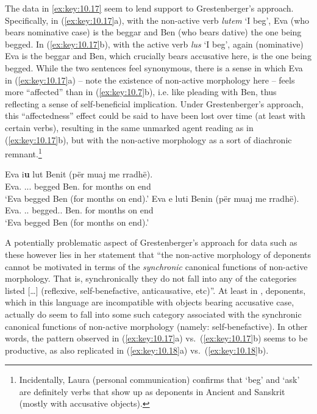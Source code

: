 \documentclass[output=paper]{langsci/langscibook}
\begin{document}
The  data in \eqref{ex:key:10.17} seem to lend support to Grestenberger’s
approach. Specifically, in (\ref{ex:key:10.17}a), with the non-active verb
\emph{lutem} ‘I beg’, Eva (who bears nominative case) is the beggar and Ben
(who bears dative) the one being begged. In (\ref{ex:key:10.17}b), with the active
verb \emph{lus} ‘I beg’, again (nominative) Eva is the beggar and Ben, which
crucially bears accusative here, is the one being begged. While the two
sentences feel synonymous, there is a sense in which Eva in (\ref{ex:key:10.17}a) –
note the existence of non-active morphology here – feels more
\enquote{affected} than in (\ref{ex:key:10.7}b), i.e. like pleading with Ben,
thus reflecting a sense of self-beneficial implication. Under Grestenberger’s
approach, this \enquote{affectedness} effect could be said to have been lost
over time (at least with certain verbs), resulting in the same unmarked agent
reading as in (\ref{ex:key:10.17}b), but with the non-active morphology as a
sort of diachronic remnant.\footnote{Incidentally, Laura
    \citeauthor{Grestenberger2014} (personal communication) confirms that ‘beg’
    and ‘ask’ are definitely verbs that show up as deponents in Ancient 
    and Sanskrit (mostly with accusative objects).}

\ea\label{ex:key:10.17} 
    \ea
	\gll    Eva i\textbf{u} lut Benit (për muaj me rradhë).\\
            Eva.\Nom{}  \Cl.\Tsg.\Dat.\textbf{\Nact} begged Ben.\Dat{} \hphantom{(}for months on end\\
    \glt    `Eva begged Ben (for months on end).'
    \ex
	\gll    Eva e luti Benin (për muaj me rradhë).\\
            Eva.\Nom{}  \Cl.\Tsg.\Acc{}  begged.\Act.\Tsg{} Ben.\Acc{} \hphantom{(}for months on end\\
    \glt    `Eva begged Ben (for months on end).'
    \z
\z

A potentially problematic aspect of Grestenberger’s approach for data such as
these however lies in her statement that “the non-active morphology of
deponents cannot be motivated in terms of the \emph{synchronic} canonical
functions of non-active morphology. That is, synchronically they do not fall
into any of the categories listed […] (reflexive, self-benefactive,
anticausative, etc)”. At least in , deponents, which in this language
are incompatible with objects bearing accusative case, actually do seem to fall
into some such category associated with the synchronic canonical functions of
non-active morphology (namely: self-benefactive). In other words, the pattern
observed in (\ref{ex:key:10.17}a) vs.\ (\ref{ex:key:10.17}b) seems to be productive, as
also replicated in (\ref{ex:key:10.18}a) vs.\ (\ref{ex:key:10.18}b).
\end{document}
